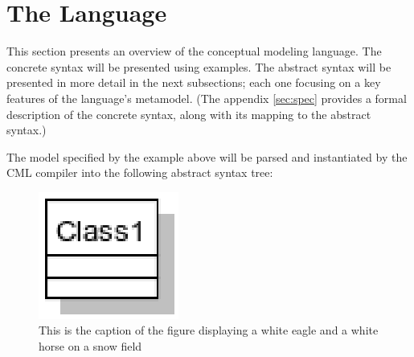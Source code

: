 \section{The Language}\label{sec:lang}
%
This section presents an overview of the conceptual modeling language.
The concrete syntax will be presented using examples.
The abstract syntax will be presented in more detail in the next subsections; each one focusing on a key features of the language's metamodel. (The appendix \ref{sec:spec} provides a formal description of the concrete syntax, along with its mapping to the abstract syntax.)



The model specified by the example above will be parsed and instantiated by the CML compiler into the following abstract syntax tree:

\label{fig:ast}
\begin{figure}
\centering
\includegraphics{language/main}
\caption{This is the caption of the figure displaying a white eagle and
a white horse on a snow field}
\end{figure}
